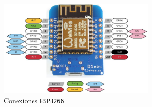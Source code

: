 \begin{figure}[H]
    \centering
    \includegraphics[width=0.7\textwidth]{images/2-hardware/componentes/conexiones_ESP.png}
    \caption{Conexiones \texttt{ESP8266}}
    \label{fig:hardware/modulos/conexiones_esp}
\end{figure}